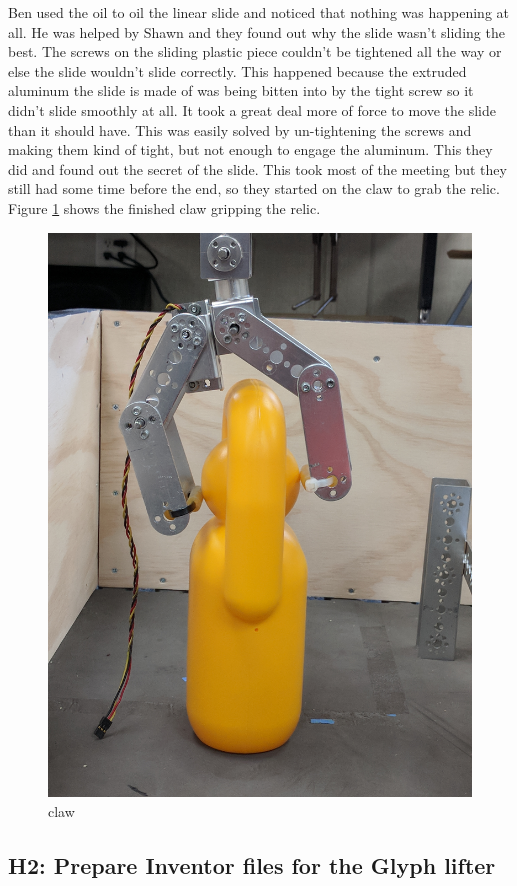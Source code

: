 \documentclass{article}
\begin{document}
Ben used the oil to oil the linear slide and noticed that nothing was happening at all. He was helped by Shawn and they found out why the slide wasn't sliding the best. The screws on the sliding plastic piece couldn't be tightened all the way or else the slide wouldn't slide correctly. This happened because the extruded aluminum the slide is made of was being bitten into by the tight screw so it didn't slide smoothly at all. It took a great deal more of force to move the slide than it should have. This was easily solved by un-tightening the screws and making them kind of tight, but not enough to engage the aluminum. This they did and found out the secret of the slide. This took most of the meeting but they still had some time before the end, so they started on the claw to grab the relic. Figure \ref{fig:claw} shows the finished claw gripping the relic.
\begin{figure}[h]
    \centering
    \includegraphics[width=.6\textwidth]{02/images/clawgrippingrelic.jpg}
    \caption{claw}
    \label{fig:claw}
\end{figure}

\subsection{H2: Prepare Inventor files for the Glyph lifter}
\end{document}
